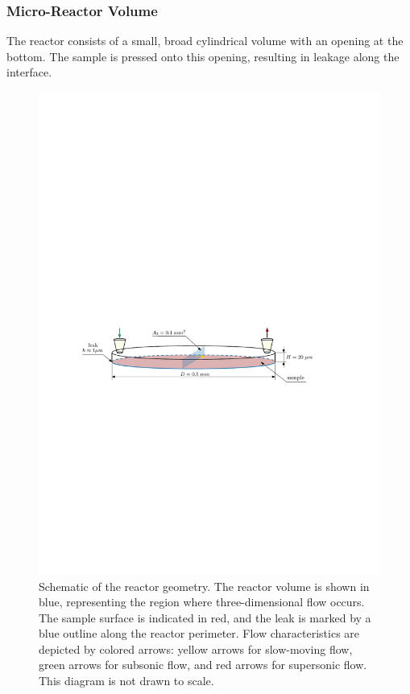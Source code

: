 \subsubsection*{Micro-Reactor Volume}
	The reactor consists of a small, broad cylindrical volume with an opening at the bottom.
	The sample is pressed onto this opening, resulting in leakage along the interface.
	\begin{figure}[H]
	    \centering
	    \includegraphics[width=\textwidth]{src/03_analytical-work/fig_reactor-geometry.pdf}
	    \caption{
	        Schematic of the reactor geometry.
	        The reactor volume is shown in blue, representing the region where three-dimensional flow occurs.
	        The sample surface is indicated in red, and the leak is marked by a blue outline along the reactor perimeter.
	        Flow characteristics are depicted by colored arrows: yellow arrows for slow-moving flow, green arrows for subsonic flow, and red arrows for supersonic flow.
	        This diagram is not drawn to scale.
	    }
	    \label{fig:geometry-reactor}
	\end{figure}

